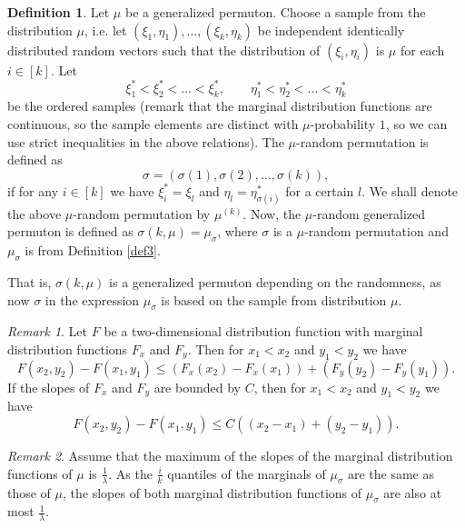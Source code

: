 \documentclass[12pt,twoside]{article}
\theoremstyle{definition}
\newtheorem{definition}[theorem]{Definition}
\theoremstyle{remark}
\numberwithin{equation}{section}
\theoremstyle{plain}
\theoremstyle{remark}
\newtheorem{rem}{Remark}[section]
\begin{document}
\begin{definition}  \label{def4}
Let $\mu$ be a generalized permuton.
Choose a sample from the distribution $\mu$, i.e.
let $(\xi_1, \eta_1), \dots , (\xi_k, \eta_k)$
be independent identically distributed random vectors such that the distribution
of $(\xi_i, \eta_i)$ is $\mu$ for each $i\in [k]$.
Let
$$
\xi_1^\ast< \xi_2^\ast < \dots < \xi_k^\ast , \qquad
\eta_1^\ast< \eta_2^\ast < \dots < \eta_k^\ast
$$
be the ordered samples
(remark that the marginal distribution functions are continuous, so the sample elements are
distinct with $\mu$-probability $1$, so we can use strict inequalities in the above relations).
%
The  $\mu$-random permutation is defined as
$$
\sigma=(\sigma(1), \sigma(2), \dots , \sigma(k)),
$$
if for any $i\in[k]$ we have $\xi_i^\ast =\xi_l$ and $\eta_l = \eta_{\sigma(i)}^\ast$ for 
a certain $l$.
%
We shall denote the above $\mu$-random permutation by $\mu^{(k)}$.
%
Now, the $\mu$-random generalized permuton is defined as
$\sigma(k,\mu) =\mu_\sigma$, where $\sigma$ is a $\mu$-random permutation 
and $\mu_\sigma$ is from Definition \ref{def3}.
\end{definition} 
%

That is, $\sigma(k,\mu)$ is a generalized permuton depending on the randomness,
as now $\sigma$ in the expression $\mu_\sigma$ is based on the sample from distribution $\mu$.
%

\begin{rem}
Let $F$ be a two-dimensional distribution function with marginal distribution functions
$F_x$  and $F_y$.
Then for $x_1<x_2$ and $y_1<y_2$ we have
\begin{equation} \label{H7}
F(x_2, y_2) -  F(x_1, y_1) \le (F_x(x_2) -  F_x(x_1)) + (F_y(y_2) -  F_y(y_1)).
\end{equation}
If the slopes of $F_x$  and $F_y$ are bounded by $C$, then
for $x_1<x_2$ and $y_1<y_2$ we have
\begin{equation} \label{H7+}
F(x_2, y_2) -  F(x_1, y_1) \le C((x_2 -  x_1) + (y_2 -  y_1)).
\end{equation}
\end{rem}
%

\begin{rem}
Assume that the maximum of the slopes of the marginal distribution functions of $\mu$
is $\frac{1}{\lambda}$.
As the $\frac{i}{k}$ quantiles of the marginals of $\mu_\sigma$ are the same as those of $\mu$,
the slopes of both marginal distribution functions of $\mu_\sigma$
are also at most $\frac{1}{\lambda}$.
\end{rem}
%
\end{document}
